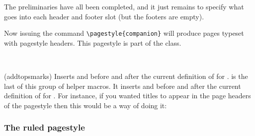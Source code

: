 \begin{plainlist}
    The preliminaries have all been completed, and it just remains to specify
what goes into each header and footer slot 
(but the footers are empty).
\begin{lcode}
%
  {\normalfont\bfseries\thepage}{}{%
   \normalfont\bfseries\leftmark}
%
  {\normalfont\bfseries\rightmark}{}{%
   \normalfont\bfseries\thepage}
\end{lcode}

    Now issuing the command \verb?\pagestyle{companion}? will produce pages 
typeset with  pagestyle headers. This pagestyle
is part of the class.

\begin{syntax}
\cmd{\addtopsmarks} \\
\end{syntax}
\glossary(addtopsmarks)%
  {}%
  {Inserts  and  before and after the current
   definition of  for .}
\cmd{\addtopsmarks} is the last
of this group of helper macros. It inserts  and  
before and after the current definition of  
for . For instance, if you wanted  titles to appear
in the page headers of the  pagestyle then this would be a way
of doing it:
\begin{lcode}
\end{lcode}


\subsubsection{The ruled pagestyle}


\end{plainlist}
